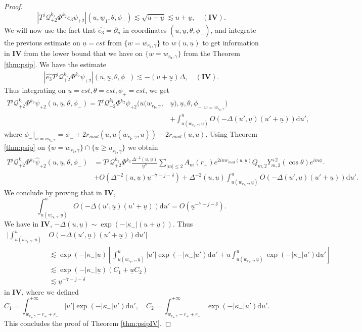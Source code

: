 \documentclass[reqno]{amsart}
\numberwithin{equation}{section}
\newcommand{\quatre}{\mathbf{IV}}
\newcommand{\mcq}{\mathcal{Q}}
\newcommand{\wbar}{\underline{w}}
\newcommand{\ubar}{{\underline{u}}}
\newcommand{\carterp}{\mcq_{+2}}
\newcommand{\dee}{\mathrm{d}}
\newcommand{\psihat}{\widehat{\psi}}
\newcommand{\ethat}{\widehat{e_3}}
\newcommand{\rb}{r_\mathfrak{b}}
\newcommand{\psip}{\psi_{+2}}
\newcommand{\psihatp}{\psihat_{+2}}
\newcommand{\sfrak}{2}
\theoremstyle{plain}
\theoremstyle{definition}
\theoremstyle{remark}
\numberwithin{equation}{section}
\begin{document}
\begin{proof}
$$|T^j\carterp^{k_1}\Phi^{k_2}e_3\psip|(u,\wbar_1,\theta,\phi_{-})\lesssim \sqrt{u+\ubar}\lesssim u+\ubar,\quad (\quatre).$$
We will now use the fact that $\ethat=\partial_u$ in coordinates $(u,\ubar,\theta,\phi_{+})$, and integrate the previous estimate on $\ubar=cst$ from $\{w= w_{\rb,\gamma}\}$ to $w(u,\ubar)$ to get information in $\quatre$ from the lower bound that we have on $\{w= w_{\rb,\gamma}\}$ from the Theorem \ref{thm:psip}. We have the estimate 
\begin{align}\label{eqn:goall}
    |\ethat T^j\carterp^{k_1}\Phi^{k_2}\psip|(u,\ubar,\theta,\phi_{-})\lesssim -(u+\ubar)\Delta,\quad (\quatre).
\end{align}
Thus integrating on $\ubar=cst,\theta=cst,\phi_{+}=cst$, we get 
\begin{align*}
    T^j\carterp^{k_1}\Phi^{k_2}\psip(u,\ubar,\theta,\phi_{-})=T^j\carterp^{k_1}\Phi^{k_2}\psip(u(w_{\rb,\gamma},&\ubar),\ubar,\theta,\phi_{-}|_{w=w_{\rb,\gamma}})\\
    &+\int_{u(w_{\rb,\gamma},\ubar)}^uO(-\Delta(u',\ubar)(u'+\ubar))\dee u',
\end{align*}
where $\phi_{-}|_{w=w_{\rb,\gamma}}=\phi_{-}+2r_{mod}(\ubar,u(w_{\rb,\gamma},\ubar))-2r_{mod}(\ubar,u)$. Using Theorem \ref{thm:psip} on $\{w=  w_{\rb,\gamma}\}\cap\{\ubar\geq\ubar_{\rb,\gamma}\}$ we obtain 
\begin{align*}
    T^j\carterp^{k_1}\Phi^{k_2}\psihatp(u,\ubar,\theta,\phi_{-})&=T^j\carterp^{k_1}\Phi^{k_2}\frac{\Delta^{-2}(u,\ubar)}{\ubar^7}\sum_{|m|\leq2}A_m(r_-)e^{2imr_{mod}(u,\ubar)}Q_{m,\sfrak}Y_{m,\sfrak}^{+\sfrak}(\cos\theta)e^{im\phi_{-}}\\
    &+O(\Delta^{-2}(u,\ubar)\ubar^{-7-j-\delta})+\Delta^{-2}(u,\ubar)\int_{u(w_{\rb,\gamma},\ubar)}^uO(-\Delta(u',\ubar)(u'+\ubar))\dee u'.
\end{align*}
We conclude by proving that in $\quatre$, 
$$\int_{u(w_{\rb,\gamma},\ubar)}^uO(-\Delta(u',\ubar)(u'+\ubar))\dee u'=O(\ubar^{-7-j-\delta}).$$
We have in $\quatre$, $-\Delta(u,\ubar)\sim\exp(-|\kappa_-|(u+\ubar))$. Thus 
\begin{align*}
    \Bigg|\int_{u(w_{\rb,\gamma},\ubar)}^u&O(-\Delta(u',\ubar)(u'+\ubar))\dee u'\Bigg|\\
    &\lesssim \exp(-|\kappa_-|\ubar)\left[\int_{u(w_{\rb,\gamma},\ubar)}^u |u'|\exp(-|\kappa_-|u')\dee u'+\ubar\int_{u(w_{\rb,\gamma},\ubar)}^u \exp(-|\kappa_-|u')\dee u'\right]\\
    &\lesssim \exp(-|\kappa_-|\ubar)(C_1+\ubar C_2)\\
    &\lesssim\ubar^{-7-j-\delta}
\end{align*}
in $\quatre$, where we defined
$$C_1=\int_{w_{\rb,\gamma}-r_++r_-}^{+\infty} |u'|\exp(-|\kappa_-|u')\dee u', \quad C_2=\int_{w_{\rb,\gamma}-r_++r_-}^{+\infty} \exp(-|\kappa_-|u')\dee u'.$$
This concludes the proof of Theorem \ref{thm:psipIV}.
\end{proof}
\end{document}
